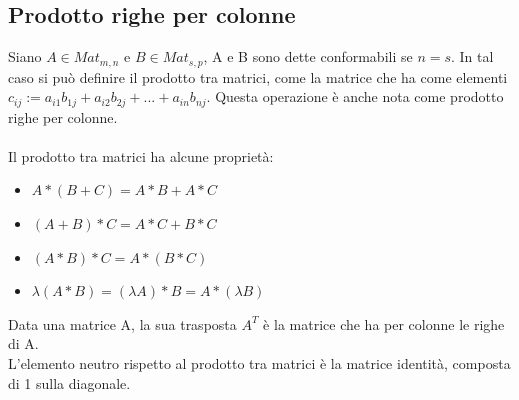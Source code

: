 \documentclass{article}
\begin{document}
\subsection{Prodotto righe per colonne}
Siano $A\in Mat_{m,n}$ e $B\in Mat_{s,p}$, A e B sono dette conformabili se $n=s$. In tal caso si può definire il prodotto tra matrici, come la matrice che ha come elementi $c_{ij}:=a_{i1}b_{1j}+a_{i2}b_{2j}+...+a_{in}b_{nj}$. Questa operazione è anche nota come prodotto righe per colonne.\\\\
Il prodotto tra matrici ha alcune proprietà:
\begin{itemize}
    \item $A*(B+C)=A*B+A*C$
    \item $(A+B)*C=A*C+B*C$
    \item $(A*B)*C=A*(B*C)$
    \item $\lambda(A*B)=(\lambda A)*B=A*(\lambda B)$
\end{itemize}

Data una matrice A, la sua trasposta $A^T$ è la matrice che ha per colonne le righe di A.\\
L'elemento neutro rispetto al prodotto tra matrici è la matrice identità, composta di 1 sulla diagonale.
\end{document}
